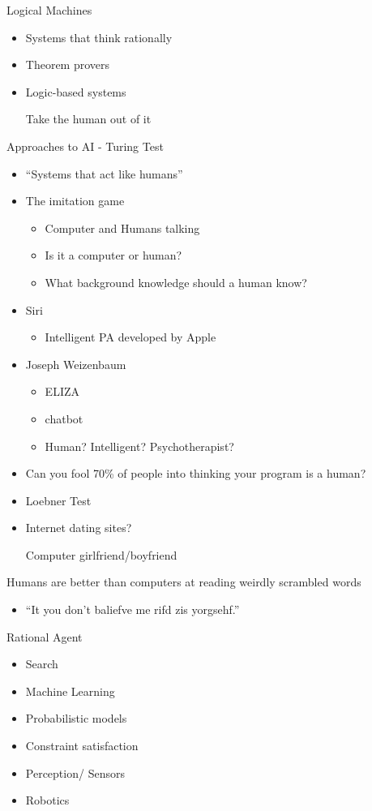 Logical Machines
\begin{itemize}
  \item Systems that think rationally
  \item Theorem provers
  \item Logic-based systems

	 Take the human out of it
\end{itemize}

Approaches to AI - Turing Test
\begin{itemize}
  \item ``Systems that act like humans''
  \item The imitation game
        \begin{itemize}
          \item Computer and Humans talking
	   \item Is it a computer or human? 
	   \item What background knowledge should a human know?
        \end{itemize}
  \item Siri
        \begin{itemize}
          \item Intelligent PA developed by Apple 
        \end{itemize}
  \item Joseph Weizenbaum
        \begin{itemize}
          \item ELIZA
	   \item chatbot
	   \item Human? Intelligent? Psychotherapist?
        \end{itemize}
  \item Can you fool 70\% of people into thinking your program is a human? 
  \item Loebner Test
  \item Internet dating sites?

	 Computer girlfriend/boyfriend 
\end{itemize}

Humans are better than computers at reading weirdly scrambled words
\begin{itemize} 
  \item ``It you don't baliefve me rifd zis yorgsehf.''
\end{itemize}

Rational Agent
\begin{itemize}
  \item Search
  \item Machine Learning
  \item Probabilistic models
  \item Constraint satisfaction
  \item Perception/ Sensors
  \item Robotics
\end{itemize}


